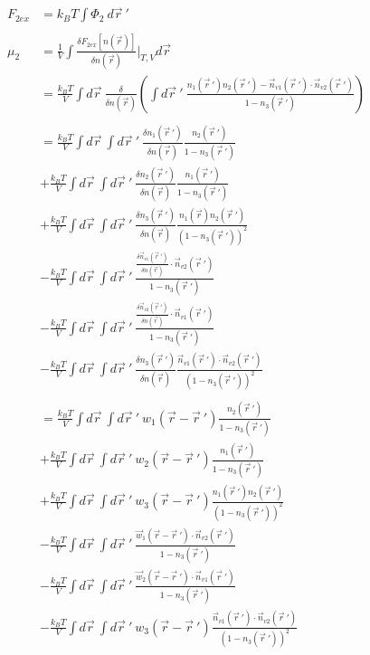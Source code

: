 \documentclass[double,12pt]{revtex4-2}
\begin{document}
\begin{align}
    F_{2ex} &= k_BT\int \Phi_2 ~d\vec r~' \\ \nonumber\\
    \mu_2 &= \frac{1}{V}\int \frac{\delta F_{2ex}[n(\vec r)]}{\delta 
          n(\vec r)}\bigg|_{T,V} d\vec{r} \\
%
          &= \frac{k_BT}{V} \int d\vec r ~\frac{\delta }{\delta n(\vec r)}
          \left(\int d \vec r~' ~\frac{n_1(\vec r~')n_2(\vec r~')-\vec n_{v1}
          (\vec r~')\cdot \vec n_{v2}(\vec r~')}{1-n_3(\vec r~')}\right) 
          \nonumber\\ \\        
%
          &= \frac{k_BT}{V} \int d\vec r~ \int d \vec r~' ~
          \frac{\delta n_1(\vec r~')}{\delta n(\vec r)}
          \frac{n_2(\vec r~')}{1-n_3(\vec r~')}   \nonumber\\
          &+\frac{k_BT}{V} \int d\vec r~ \int d \vec r~' ~
          \frac{\delta n_2(\vec r~')}{\delta n(\vec r)}
          \frac{n_1(\vec r~')}{1-n_3(\vec r~')}   \nonumber\\
          &+\frac{k_BT}{V} \int d\vec r~ \int d \vec r~'~
          \frac{\delta n_3(\vec r~')}{\delta n(\vec r)}
          \frac{n_1(\vec r)n_2(\vec r~')}{(1-n_3(\vec r~'))^2}  \nonumber\\
          &-\frac{k_BT}{V} \int d\vec r~ \int d \vec r~'~ \frac{\frac{\delta 
          \vec n_{v1}(\vec r~')}{\delta n(\vec r)}\cdot \vec n_{v2}(\vec r~')}
          {1-n_3(\vec r~')}  \nonumber\\
          &-\frac{k_BT}{V} \int d\vec r~ \int d \vec r~'~ \frac{\frac{\delta 
          \vec n_{v2}(\vec r~')}{\delta n(\vec r)}\cdot \vec n_{v1}(\vec r~')}
          {1-n_3(\vec r~')}  \nonumber\\
          &-\frac{k_BT}{V} \int d\vec r~\int d \vec r~'~
          \frac{\delta n_3(\vec r~')}{\delta n(\vec r)}
           \frac{\vec n_{v1}(\vec r~')\cdot \vec n_{v2}(\vec r~')}
           {(1-n_3(\vec r~'))^2} \\ \nonumber\\
%
          &= \frac{k_BT}{V} \int d\vec r~ \int d \vec r~' ~w_1(\vec r-\vec r~')
          \frac{n_2(\vec r~')}{1-n_3(\vec r~')}   \nonumber\\
          &+\frac{k_BT}{V} \int d\vec r~ \int d \vec r~' ~w_2(\vec r-\vec r~')
          \frac{n_1(\vec r~')}{1-n_3(\vec r~')}   \nonumber\\
          &+\frac{k_BT}{V} \int d\vec r~ \int d \vec r~'~w_3(\vec r - \vec r~') 
          \frac{n_1(\vec r~')n_2(\vec r~')}{(1-n_3(\vec r~'))^2}  \nonumber\\
          &-\frac{k_BT}{V} \int d\vec r~ \int d \vec r~' ~\frac{\vec w_1(\vec r 
          - \vec r~')\cdot \vec n_{v2}(\vec r~')}{1-n_3(\vec r~')}  \nonumber\\
          &-\frac{k_BT}{V} \int d\vec r~ \int d \vec r~'~ \frac{\vec w_2(\vec r 
          - \vec r~')\cdot \vec n_{v1}(\vec r~')}{1-n_3(\vec r~')}  \nonumber\\
          &-\frac{k_BT}{V} \int d\vec r~\int d \vec r~'~ w_3(\vec r - \vec r~')
           \frac{\vec n_{v1}(\vec r~')\cdot \vec n_{v2}(\vec r~')}
           {(1-n_3(\vec r~'))^2} 
\end{align}
\end{document}
